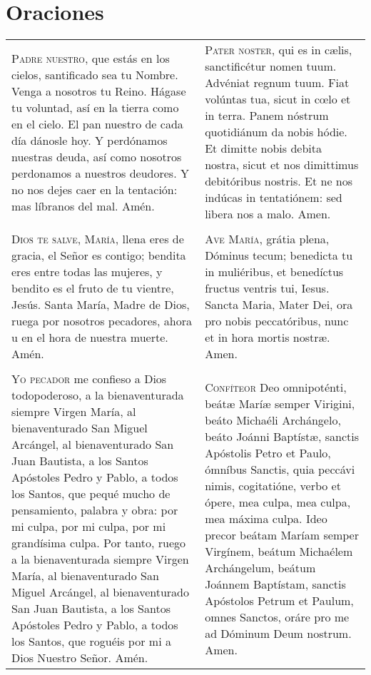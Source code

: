 \documentclass[./00_main.tex]{subfiles}
\begin{document}
\chapter*{Oraciones}

\begin{longtable} { p{} p{} }
    \label{ourFather}
    \textsc{Padre nuestro}, que estás en los cielos, santificado sea tu Nombre. Venga a nosotros tu Reino.
    Hágase tu voluntad, así en la tierra como en el cielo. El pan nuestro de cada día dánosle hoy.
    Y perdónamos nuestras deuda, así como nosotros perdonamos a nuestros deudores.
    Y no nos dejes caer en la tentación: mas líbranos del mal. Amén.
        &
    \textsc{Pater noster}, qui es in cælis, sanctificétur nomen tuum. Advéniat regnum tuum.
    Fiat volúntas tua, sicut in c{\oe}lo et in terra. Panem nóstrum quotidiánum da nobis hódie.
    Et dimitte nobis debita nostra, sicut et nos dimittimus debitóribus nostris.
    Et ne nos indúcas in tentatiónem: sed libera nos a malo. Amen.\\\\

    \label{hailMary}
    \textsc{Dios te salve, María}, llena eres de gracia, el Señor es contigo; bendita eres entre todas las mujeres,
    y bendito es el fruto de tu vientre, Jesús. Santa María, Madre de Dios, ruega por nosotros pecadores,
    ahora u en el hora de nuestra muerte. Amén.
        &
    \textsc{Ave María}, grátia plena, Dóminus tecum; benedicta tu in muliéribus, et benedíctus fructus ventris tui,
    Iesus. Sancta Maria, Mater Dei, ora pro nobis peccatóribus, nunc et in hora mortis nostræ. Amen.\\\\

    \label{iConfess}
    \textsc{Yo pecador} me confieso a Dios todopoderoso, a la bienaventurada siempre Virgen María, al bienaventurado San Miguel Arcángel,
    al bienaventurado San Juan Bautista, a los Santos Apóstoles Pedro y Pablo, a todos los Santos, que pequé mucho
    de pensamiento, palabra y obra: por mi culpa, por mi culpa, por mi grandísima culpa. Por tanto, ruego a la bienaventurada
    siempre Virgen María, al bienaventurado San Miguel Arcángel, al bienaventurado San Juan Bautista, a los Santos Apóstoles
    Pedro y Pablo, a todos los Santos, que roguéis por mi a Dios Nuestro Señor. Amén.
        &
    \textsc{Confíteor} Deo omnipoténti, beát{\ae} Marí{\ae} semper Virigini, beáto Michaéli Archángelo, beáto Joánni Baptíst{\ae}, sanctis Apóstolis Petro et Paulo,
    ómníbus Sanctis, quia peccávi nimis, cogitatióne, verbo et ópere, mea culpa, mea culpa, mea máxima culpa. Ideo precor beátam
    Maríam semper Virgínem, beátum Michaélem Archángelum, beátum Joánnem Baptístam, sanctis Apóstolos Petrum et Paulum, omnes Sanctos,
    oráre pro me ad Dóminum Deum nostrum. Amen.\\


\end{longtable}
\end{document}
